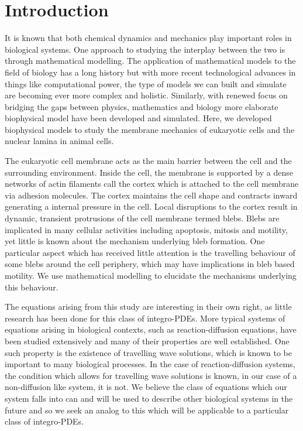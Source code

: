 \chapter{Introduction}

It is known that both chemical dynamics and mechanics play important roles in biological systems. One approach to studying the interplay between the two is through mathematical modelling. The application of mathematical models to the field of biology has a long history but with more recent technological advances in things like computational power, the type of models we can built and simulate are becoming ever more complex and holistic.  Similarly, with renewed focus on bridging the gaps between physics, mathematics and biology more elaborate biophysical model have been developed and simulated. Here, we developed biophysical models to study the membrane mechanics of eukaryotic cells and the nuclear lamina in animal cells. 

The eukaryotic cell membrane acts as the main barrier between the cell and the surrounding environment. Inside the cell, the membrane is supported by a dense networks of actin filaments call the cortex which is attached to the cell membrane via adhesion molecules. The cortex maintains the cell shape and contracts inward generating a internal pressure in the cell. Local disruptions to the cortex result in dynamic, transient protrusions of the cell membrane termed blebs. Blebs are implicated in many cellular activities including apoptosis, mitosis and motility, yet little is known about the mechanism underlying bleb formation. One particular aspect which has received little attention is the travelling behaviour of some blebs around the cell periphery, which may have implications in bleb based motility. We use mathematical modelling to elucidate the mechanisms underlying this behaviour. 

The equations arising from this study are interesting in their own right, as little research has been done for this class of integro-PDEs. More typical systems of equations arising in biological contexts, such as reaction-diffusion equations, have been studied extensively and many of their properties are well established. One such property is the existence of travelling wave solutions, which is known to be important to many biological processes. In the case of reaction-diffusion systems, the condition which allows for travelling wave solutions is known, in our case of a non-diffusion like system, it is not. We believe the class of equations which our system falls into can and will be used to describe other biological systems in the future and so we seek an analog to this which will be applicable to a particular class of integro-PDEs. 

